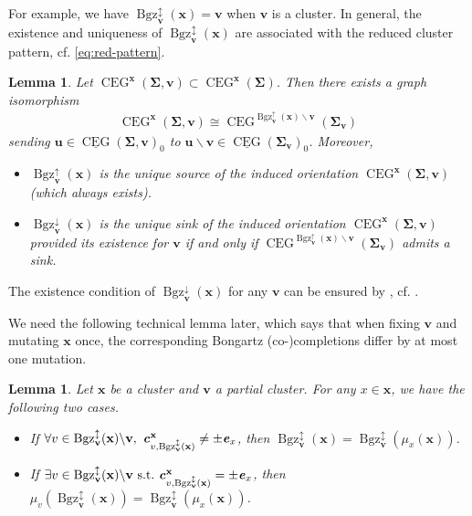\documentclass[11pt,reqno]{amsart}
\theoremstyle{plain}
\newtheorem{lemma}[theorem]{Lemma}
\theoremstyle{definition}
\numberwithin{equation}{section}
\newcommand\<{\langle}
\renewcommand\>{\rangle}
\newcommand{\CEG}{\operatorname{CEG}} %
\newcommand{\uCEG}{\underline{\CEG}} %
\def\vv{\mathbf{v}}
\def\uu{\mathbf{u}}
\newcommand{\bfit}[1]{\textbf{\textit{#1}}}
\def\seeds{\mathbf{\Sigma}}
\def\xx{\mathbf{x}}%
\def\cvec{\bfit{c}}
\newcommand{\Bgzp}[2]{\operatorname{Bgz}^{\uparrow}_{#2}(#1)}
\newcommand{\Bgzm}[2]{\operatorname{Bgz}^{\downarrow}_{#2}(#1)}
\newcommand{\Bgzpm}[2]{\operatorname{Bgz}^{\updownarrow}_{#2}(#1)}
\begin{document}
For example, we have $\Bgzpm{{\xx}}{\vv}=\vv$ when $\vv$ is a cluster.
In general, the existence and uniqueness of $\Bgzpm{{\xx}}{\vv}$ are associated with the reduced cluster pattern, cf. \eqref{eq:red-pattern}.

\begin{lemma}\label{lem:Bong}\cite[Thm.~5.4, Cor.~5.5]{CGY}
Let $\CEG^\xx(\seeds,\vv)\subset\CEG^\xx(\seeds)$.
Then there exists a graph isomorphism
\begin{gather}
    \CEG^\xx(\seeds,\vv)\cong\CEG^{\Bgzp{\xx}{\vv}\backslash\vv}(\seeds_\vv)
\end{gather}
sending $\uu\in\uCEG(\seeds,\vv)_0$ to $\uu\backslash\vv\in\uCEG(\seeds_\vv)_0$.
Moreover,
    \begin{itemize}
    \item $\Bgzp{\xx}{\vv}$ is the unique source of the induced orientation $\CEG^\xx(\seeds,\vv)$
    (which always exists).
    \item $\Bgzm{\xx}{\vv}$ is the unique sink of the induced orientation $\CEG^\xx(\seeds,\vv)$
    provided its existence for $\vv$ if and only if $\CEG^{\Bgzp{\xx}{\vv}\backslash\vv}(\seeds_\vv)$ admits a sink.
\end{itemize}
\end{lemma}

The existence condition of $\Bgzm{\xx}{\vv}$ for any $\vv$ can be ensured by , cf. \cite[Thm.~3.1.3]{Mul}.

We need the following technical lemma later, which says that when fixing $\vv$ and mutating $\xx$ once,
the corresponding Bongartz (co-)completions differ by at most one mutation.

\begin{lemma}\cite[Lem.~3.10]{FGL}\label{lem:Bgz-mut}
Let $\xx$ be a cluster and $\vv$ a partial cluster.
For any $x\in\xx$, we have the following two cases.
\begin{itemize}
    \item If $\forall v\in\Bgzpm{\xx}{\vv}\backslash\vv,~\cvec^\xx_{v,\Bgzpm{\xx}{\vv}}\ne\pm\bfit{e}_x$, then $\Bgzpm{\xx}{\vv}=\Bgzpm{\mu_x(\xx)}{\vv}$.
    \item If $\exists v\in\Bgzpm{\xx}{\vv}\backslash\vv~\text{s.t.}~\cvec^\xx_{v,\Bgzpm{\xx}{\vv}}=\pm\bfit{e}_x$, then $\mu_{v}(\Bgzpm{\xx}{\vv})=\Bgzpm{\mu_x(\xx)}{\vv}$.
\end{itemize}
\end{lemma}
\end{document}
